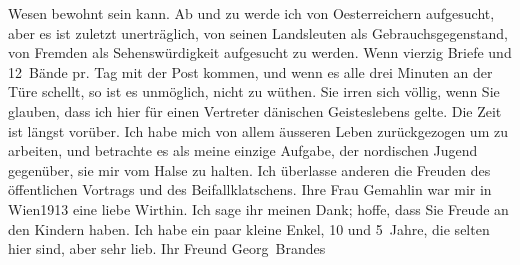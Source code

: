 \begin{ledgroupsized}[t]{13cm}
                    Wesen bewohnt sein kann.\pend
           \pstart
           Ab und zu werde ich von Oesterreichern
                    aufgesucht, aber es ist zuletzt unerträglich, von seinen Landsleuten als
                    Gebrauchsgegenstand, {\pb}von
                    Fremden als Sehenswürdigkeit aufgesucht zu werden. Wenn vierzig Briefe und
                    12 Bände pr. Tag  mit der Post \introOben{}kommen,\introOben{} und wenn es alle drei Minuten an der Türe
                    schellt, so ist es unmöglich, nicht zu wüthen.\pend
           \pstart
           Sie irren sich völlig, wenn Sie glauben, dass ich hier für einen Vertreter dänischen Geisteslebens gelte. Die Zeit ist
                    längst vorüber. Ich habe mich von allem äusseren Leben zurückgezogen um zu
                    arbeiten, und betrachte es als meine einzige Aufgabe, der nordischen Jugend gegenüber, sie mir vom Halse zu halten.
                    Ich überlasse anderen die Freuden des öffentlichen Vortrags und des
                    Beifallklatschens.\pend
           \pstart
           Ihre Frau Gemahlin war mir
                    in Wien1913 eine liebe Wirthin. Ich sage ihr meinen Dank; hoffe, dass Sie
                    Freude an den Kindern haben. Ich habe ein paar kleine Enkel, 10 und 5 Jahre, die selten hier sind, aber sehr lieb.\pend
           \pstart Ihr Freund \spacefill\mbox{Georg Brandes}\pend{}\endnumbering{}\end{ledgroupsized}  \newcommand{\dateiname}{L02303}\newcommand{\titel}{Georg Brandes an Arthur Schnitzler, 18. 9. 1918}\newcommand{\editorInnen}{Martin Anton Müller und Gerd-Hermann Susen}
      